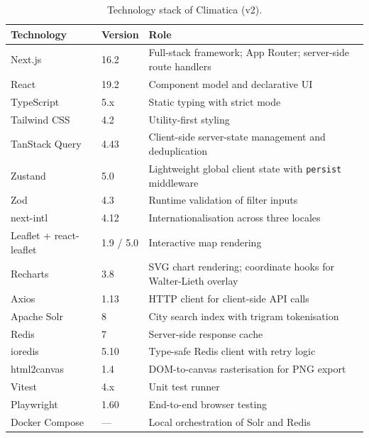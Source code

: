 \begin{table}[H]
  \centering
  \caption{Technology stack of Climatica (v2).}
  \label{tab:tech}
  \small
  \begin{tabular}{llp{6.5cm}}
    \toprule
    \textbf{Technology} & \textbf{Version} & \textbf{Role} \\
    \midrule
    Next.js        & 16.2  & Full-stack framework; App Router; server-side
                             route handlers \\
    React          & 19.2  & Component model and declarative UI \\
    TypeScript     & 5.x   & Static typing with strict mode \\
    Tailwind CSS   & 4.2   & Utility-first styling \\
    TanStack Query & 4.43  & Client-side server-state management and
                             deduplication \\
    Zustand        & 5.0   & Lightweight global client state with
                             \texttt{persist} middleware \\
    Zod            & 4.3   & Runtime validation of filter inputs \\
    next-intl      & 4.12  & Internationalisation across three locales \\
    Leaflet + react-leaflet & 1.9 / 5.0 & Interactive map rendering \\
    Recharts       & 3.8   & SVG chart rendering; coordinate hooks for
                             Walter-Lieth overlay \\
    Axios          & 1.13  & HTTP client for client-side API calls \\
    Apache Solr    & 8     & City search index with trigram tokenisation \\
    Redis          & 7     & Server-side response cache \\
    ioredis        & 5.10  & Type-safe Redis client with retry logic \\
    html2canvas    & 1.4   & DOM-to-canvas rasterisation for PNG export \\
    Vitest         & 4.x   & Unit test runner \\
    Playwright     & 1.60  & End-to-end browser testing \\
    Docker Compose & ---   & Local orchestration of Solr and Redis \\
    \bottomrule
  \end{tabular}
  \normalsize
\end{table}

